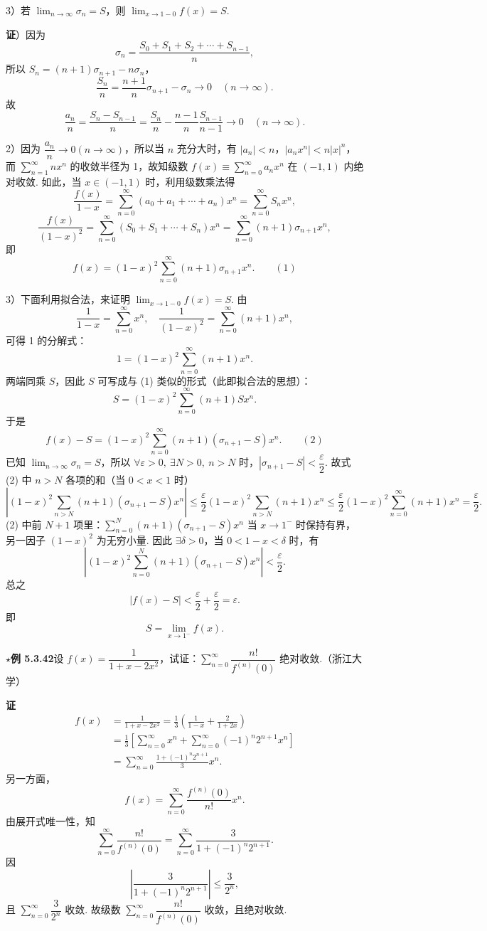 \documentclass[UTF8,12pt,a4paper,fontset=fandol]{ctexart}
\begin{document}
3）若 $\displaystyle\lim_{n\to\infty}\sigma_n=S$，则 $\displaystyle\lim_{x\to1-0}f(x)=S$.

\noindent\textbf{证}）因为
\[
  \sigma_n=\frac{S_0+S_1+S_2+\cdots+S_{n-1}}{n},
\]
所以 $S_n=(n+1)\sigma_{n+1}-n\sigma_n$，
\[
  \frac{S_n}{n}=\frac{n+1}{n}\sigma_{n+1}-\sigma_n\to0\quad(n\to\infty).
\]
故
\[
  \frac{a_n}{n}=\frac{S_n-S_{n-1}}{n}
  =\frac{S_n}{n}-\frac{n-1}{n}\frac{S_{n-1}}{n-1}\to0\quad(n\to\infty).
\]

2）因为 $\dfrac{a_n}{n}\to0(n\to\infty)$，所以当 $n$ 充分大时，有 $|a_n|<n$，$|a_nx^n|<n|x|^n$，而 $\displaystyle\sum_{n=1}^{\infty}nx^n$ 的收敛半径为 1，故知级数 $f(x)\equiv\displaystyle\sum_{n=0}^{\infty}a_nx^n$ 在 $(-1,1)$ 内绝对收敛. 如此，当 $x\in(-1,1)$ 时，利用级数乘法得
\[
  \frac{f(x)}{1-x}
  =\sum_{n=0}^{\infty}(a_0+a_1+\cdots+a_n)x^n
  =\sum_{n=0}^{\infty}S_nx^n,
\]
\[
  \frac{f(x)}{(1-x)^2}
  =\sum_{n=0}^{\infty}(S_0+S_1+\cdots+S_n)x^n
  =\sum_{n=0}^{\infty}(n+1)\sigma_{n+1}x^n,
\]
即
\[
  f(x)=(1-x)^2\sum_{n=0}^{\infty}(n+1)\sigma_{n+1}x^n. \qquad(1)
\]

3）下面利用拟合法，来证明 $\displaystyle\lim_{x\to1-0}f(x)=S$. 由
\[
  \frac1{1-x}=\sum_{n=0}^{\infty}x^n,\quad
  \frac1{(1-x)^2}=\sum_{n=0}^{\infty}(n+1)x^n,
\]
可得 1 的分解式：
\[
  1=(1-x)^2\sum_{n=0}^{\infty}(n+1)x^n.
\]
两端同乘 $S$，因此 $S$ 可写成与 (1) 类似的形式（此即拟合法的思想）：
\[
  S=(1-x)^2\sum_{n=0}^{\infty}(n+1)Sx^n.
\]
于是
\[
  f(x)-S=(1-x)^2\sum_{n=0}^{\infty}(n+1)(\sigma_{n+1}-S)x^n. \qquad(2)
\]
已知 $\displaystyle\lim_{n\to\infty}\sigma_n=S$，所以 $\forall\varepsilon>0,\ \exists N>0,\ n>N$ 时，$|\sigma_{n+1}-S|<\dfrac\varepsilon2$. 故式 (2) 中 $n>N$ 各项的和（当 $0<x<1$ 时）
\[
  \left|(1-x)^2\sum_{n>N}(n+1)(\sigma_{n+1}-S)x^n\right|
  \le\frac\varepsilon2(1-x)^2\sum_{n>N}(n+1)x^n
  \le\frac\varepsilon2(1-x)^2\sum_{n=0}^{\infty}(n+1)x^n
  =\frac\varepsilon2.
\]
(2) 中前 $N+1$ 项里：$\displaystyle\sum_{n=0}^N(n+1)(\sigma_{n+1}-S)x^n$ 当 $x\to1^-$ 时保持有界，另一因子 $(1-x)^2$ 为无穷小量. 因此 $\exists\delta>0$，当 $0<1-x<\delta$ 时，有
\[
  \left|(1-x)^2\sum_{n=0}^N(n+1)(\sigma_{n+1}-S)x^n\right|<\frac\varepsilon2.
\]
总之
\[
  |f(x)-S|<\frac\varepsilon2+\frac\varepsilon2=\varepsilon.
\]
即
\[
  S=\lim_{x\to1^-}f(x).
\]

\noindent\textbf{\(\star\)例 5.3.42}\quad 设 $f(x)=\dfrac1{1+x-2x^2}$，试证：$\displaystyle\sum_{n=0}^{\infty}\dfrac{n!}{f^{(n)}(0)}$ 绝对收敛.（浙江大学）

\noindent\textbf{证}\quad
\[
\begin{aligned}
f(x)&=\frac1{1+x-2x^2}
=\frac13\left(\frac1{1-x}+\frac2{1+2x}\right)\\
&=\frac13\left[\sum_{n=0}^{\infty}x^n+\sum_{n=0}^{\infty}(-1)^n2^{n+1}x^n\right]\\
&=\sum_{n=0}^{\infty}\frac{1+(-1)^n2^{n+1}}3x^n.
\end{aligned}
\]
另一方面，
\[
  f(x)=\sum_{n=0}^{\infty}\frac{f^{(n)}(0)}{n!}x^n.
\]
由展开式唯一性，知
\[
  \sum_{n=0}^{\infty}\frac{n!}{f^{(n)}(0)}
  =\sum_{n=0}^{\infty}\frac3{1+(-1)^n2^{n+1}}.
\]
因
\[
  \left|\frac3{1+(-1)^n2^{n+1}}\right|\le\frac3{2^n},
\]
且 $\displaystyle\sum_{n=0}^{\infty}\dfrac3{2^n}$ 收敛. 故级数 $\displaystyle\sum_{n=0}^{\infty}\dfrac{n!}{f^{(n)}(0)}$ 收敛，且绝对收敛.
\end{document}

